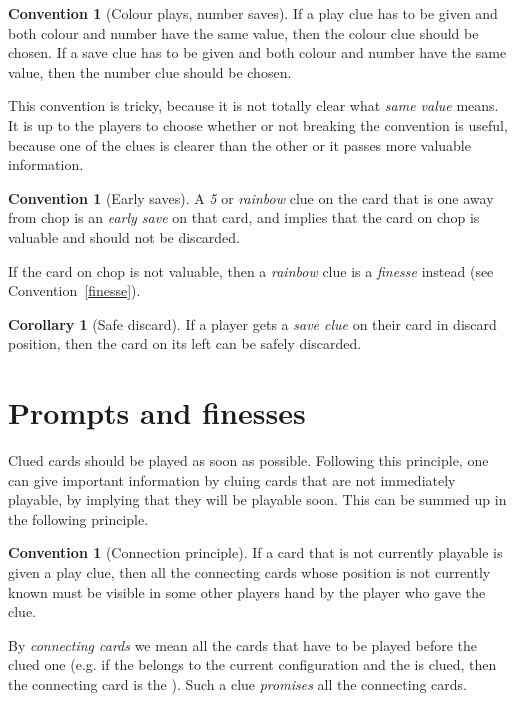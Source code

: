 \documentclass[a4paper]{article}
\theoremstyle{plain}
\theoremstyle{definition}
\newtheorem{corollary}[theorem]{Corollary}
\newtheorem{convention}[theorem]{Convention}
\begin{document}
\begin{convention}[Colour plays, number saves]
	If a play clue has to be given and both colour and number have the same value, then the colour clue should be chosen. If a save clue has to be given and both colour and number have the same value, then the number clue should be chosen.
\end{convention}

This convention is tricky, because it is not totally clear what \textit{same value} means. It is up to the players to choose whether or not breaking the convention is useful, because one of the clues is clearer than the other or it passes more valuable information.

\begin{convention}[Early saves]
	A \textit{5} or \textit{rainbow} clue on the card that is one away from chop is an \textit{early save} on that card, and implies that the card on chop is valuable and should not be discarded.
	
	If the card on chop is not valuable, then a \textit{rainbow} clue is a \textit{finesse} instead (see Convention~\ref{finesse}).
\end{convention}

\begin{corollary}[Safe discard]
	If a player gets a \textit{save clue} on their card in discard position, then the card on its left can be safely discarded.
\end{corollary}

\section{Prompts and finesses}

Clued cards should be played as soon as possible. Following this principle, one can give important information by cluing cards that are not immediately playable, by implying that they will be playable soon. This can be summed up in the following principle.

\begin{convention}[Connection principle]
	\label{connection-principle}
	If a card that is not currently playable is given a play clue, then all the connecting cards whose position is not currently known must be visible in some other players hand by the player who gave the clue.
\end{convention}

By \textit{connecting cards} we mean all the cards that have to be played before the clued one (e.g. if the  belongs to the current configuration and the  is clued, then the connecting card is the ). Such a clue \emph{promises} all the connecting cards.
\end{document}
